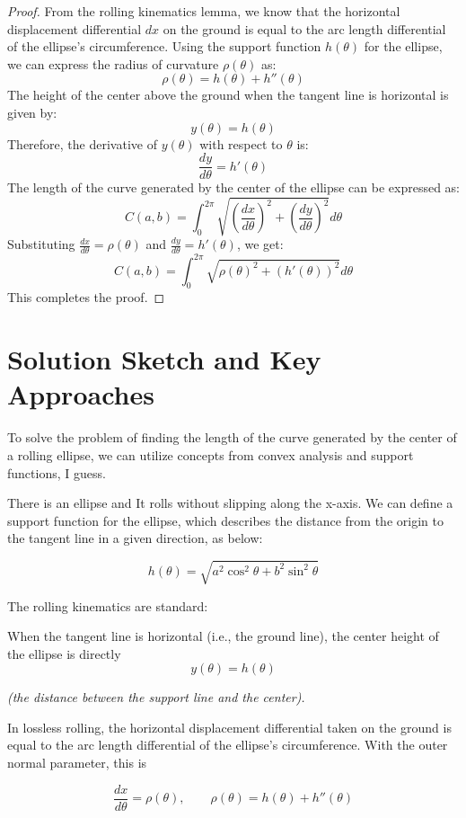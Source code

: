 \documentclass[12pt]{article}
\theoremstyle{definition}
\begin{document}
\begin{proof}
    From the rolling kinematics lemma, we know that the horizontal displacement differential $dx$ on the ground is equal to the arc length differential of the ellipse's circumference. Using the support function $h(\theta)$ for the ellipse, we can express the radius of curvature $\rho(\theta)$ as:
    \[
        \rho(\theta) = h(\theta) + h''(\theta)
    \]
    The height of the center above the ground when the tangent line is horizontal is given by:
    \[
        y(\theta) = h(\theta)
    \]
    Therefore, the derivative of $y(\theta)$ with respect to $\theta$ is:
    \[
        \frac{dy}{d\theta} = h'(\theta)
    \]
    The length of the curve generated by the center of the ellipse can be expressed as:
    \[
        C(a,b)=\int_{0}^{2\pi}\sqrt{\left(\frac{dx}{d\theta}\right)^2+\left(\frac{dy}{d\theta}\right)^2}d\theta
    \]
    Substituting $\frac{dx}{d\theta}=\rho(\theta)$ and $\frac{dy}{d\theta}=h'(\theta)$, we get:
    \[
        C(a,b)=\int_{0}^{2\pi}\sqrt{\rho(\theta)^2+\left(h'(\theta)\right)^2}d\theta
    \]
    This completes the proof.
\end{proof}

\section{Solution Sketch and Key Approaches}
To solve the problem of finding the length of the curve generated by the center of a rolling ellipse, we can utilize concepts from convex analysis and support functions, I guess.

There is an ellipse and It rolls without slipping along the x-axis. We can define a support function for the ellipse, which describes the distance from the origin to the tangent line in a given direction, as below:

\[
    h(\theta) = \sqrt{a^2\cos^2\theta+b^2\sin^2\theta}
\]

The rolling kinematics are standard:

When the tangent line is horizontal (i.e., the ground line), the center height of the ellipse is directly
\[
    y(\theta) = h(\theta)
\]

\textit{(the distance between the support line and the center).}

In lossless rolling, the horizontal displacement differential taken on the ground is equal to the arc length differential of the ellipse's circumference. With the outer normal parameter, this is

\[
    \frac{dx}{d\theta}=\rho(\theta), \qquad \rho(\theta)=h(\theta)+h''(\theta)
\]
\end{document}

